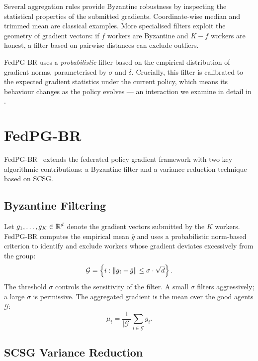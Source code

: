 Several aggregation rules provide Byzantine robustness by inspecting the
statistical properties of the submitted gradients. Coordinate-wise median and
trimmed mean are classical examples. More specialised filters exploit the
geometry of gradient vectors: if $f$ workers are Byzantine and $K - f$ workers
are honest, a filter based on pairwise distances can exclude outliers.

FedPG-BR uses a \emph{probabilistic} filter based on the empirical distribution
of gradient norms, parameterised by $\sigma$ and $\delta$. Crucially, this
filter is calibrated to the expected gradient statistics under the current
policy, which means its behaviour changes as the policy evolves --- an
interaction we examine in detail in .

\section{FedPG-BR}\label{sec:fedpgbr}

FedPG-BR~\cite{flint2023fedpgbr} extends the federated policy gradient
framework with two key algorithmic contributions: a Byzantine filter and a
variance reduction technique based on SCSG.

\subsection{Byzantine Filtering}

Let $g_1, \ldots, g_K \in \R^d$ denote the gradient vectors submitted by the
$K$ workers. FedPG-BR computes the empirical mean $\bar{g}$ and uses a
probabilistic norm-based criterion to identify and exclude workers whose
gradient deviates excessively from the group:
\[
    \mathcal{G} = \left\{ i : \norm*{g_i - \bar{g}} \le \sigma \cdot \sqrt{d} \right\}.
\]
The threshold $\sigma$ controls the sensitivity of the filter. A small $\sigma$
filters aggressively; a large $\sigma$ is permissive. The aggregated gradient
is the mean over the good agents $\mathcal{G}$:
\[
    \mu_t = \frac{1}{|\mathcal{G}|} \sum_{i \in \mathcal{G}} g_i.
\]

\subsection{SCSG Variance Reduction}

